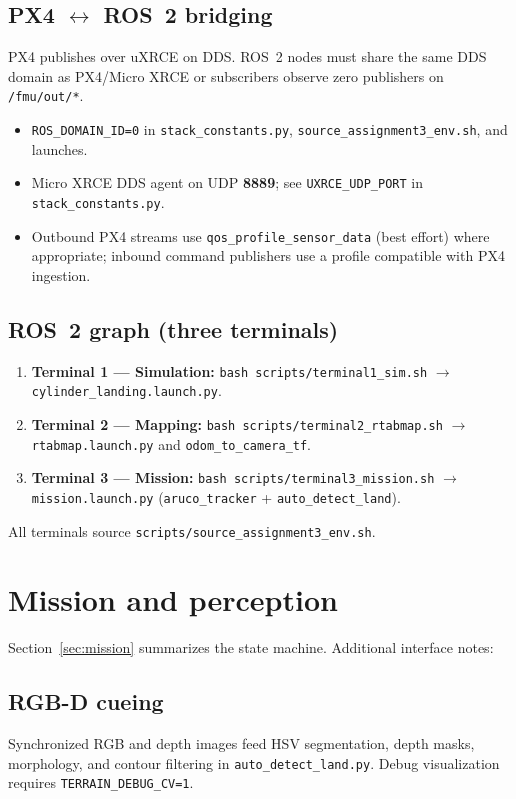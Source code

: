 \documentclass[11pt]{article}
\begin{document}
\subsection{PX4 $\leftrightarrow$ ROS~2 bridging}
PX4 publishes over uXRCE on DDS. ROS~2 nodes must share the same DDS domain as PX4/Micro XRCE or subscribers observe zero publishers on \texttt{/fmu/out/*}.
\begin{itemize}[itemsep=2pt]
    \item \texttt{ROS\_DOMAIN\_ID=0} in \texttt{stack\_constants.py}, \texttt{source\_assignment3\_env.sh}, and launches.
    \item Micro XRCE DDS agent on UDP \textbf{8889}; see \texttt{UXRCE\_UDP\_PORT} in \texttt{stack\_constants.py}.
    \item Outbound PX4 streams use \texttt{qos\_profile\_sensor\_data} (best effort) where appropriate; inbound command publishers use a profile compatible with PX4 ingestion.
\end{itemize}

\subsection{ROS~2 graph (three terminals)}
\begin{enumerate}[itemsep=2pt]
    \item \textbf{Terminal 1 --- Simulation:} \texttt{bash scripts/terminal1\_sim.sh} $\rightarrow$ \texttt{cylinder\_landing.launch.py}.
    \item \textbf{Terminal 2 --- Mapping:} \texttt{bash scripts/terminal2\_rtabmap.sh} $\rightarrow$ \texttt{rtabmap.launch.py} and \texttt{odom\_to\_camera\_tf}.
    \item \textbf{Terminal 3 --- Mission:} \texttt{bash scripts/terminal3\_mission.sh} $\rightarrow$ \texttt{mission.launch.py} (\texttt{aruco\_tracker} + \texttt{auto\_detect\_land}).
\end{enumerate}

All terminals source \texttt{scripts/source\_assignment3\_env.sh}.

\newpage
\section{Mission and perception}
Section~\ref{sec:mission} summarizes the state machine. Additional interface notes:

\subsection{RGB-D cueing}
Synchronized RGB and depth images feed HSV segmentation, depth masks, morphology, and contour filtering in \texttt{auto\_detect\_land.py}. Debug visualization requires \texttt{TERRAIN\_DEBUG\_CV=1}.
\end{document}
